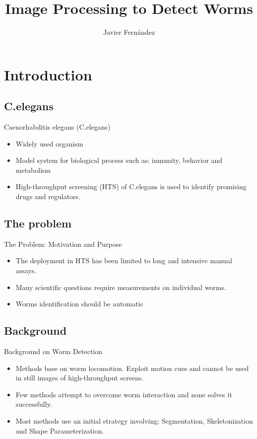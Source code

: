 \documentclass[xcolor=table]{beamer}
\title[Image Processing to Detect Worms]{Image Processing to Detect Worms}
\author[Javier Fern\'andez]{Javier Fern\'andez}
\institute[Uppsala University]{Uppsala University. Uppsala, Sweden}
\begin{document}
\maketitle


\section{Introduction}
\subsection{C.elegans}

\begin{frame}{Caenorhabditis elegans (C.elegans)}

\begin{itemize}
\item Widely used organism
\item Model system for biological process such as: inmunity,
  behavior and metabolism
\item High-throughput screening (HTS) of C.elegans is used to identify
  promising drugs and regulators.
\end{itemize}

\end{frame}

\subsection{The problem}
\begin{frame}{The Problem: Motivation and Purpose}
\begin{itemize}
\item The deployment in HTS has been limited to long and intensive manual assays.
\item Many scientific questions require measurements on individual worms.
\item Worms identification should be automatic
\end{itemize}

\end{frame}

\subsection{Background}
\begin{frame}{Background on Worm Detection}

\begin{itemize}
  \item Methods base on worm locomotion. Exploit motion cues and 
    cannot be used in still images of high-throughput screens. \pause
  \item Few methods attempt to overcome worm interaction and none
    solves it successfully. \pause
  \item Most methods use an initial strategy involving: Segmentation,
    Skeletonization and Shape Parameterization.
\end{itemize}

\end{frame}
\end{document}
